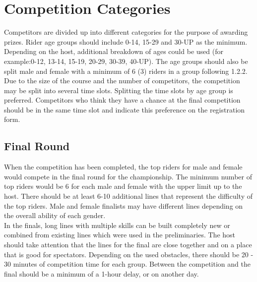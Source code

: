 \section{Competition Categories}
Competitors are divided up into different categories for the purpose of awarding prizes. Rider age groups should include 0-14, 15-29 and 30-UP as the minimum. Depending on the host, additional breakdown of ages could be used (for example:0-12, 13-14, 15-19, 20-29, 30-39, 40-UP). The age groups should also be split male and female with a minimum of 6 (3) riders in a group following 1.2.2. Due to the size of the course and the number of competitors, the competition may be split into several time slots. Splitting the time slots by age group is preferred. Competitors who think they have a chance at the final competition should be in the same time slot and indicate this preference on the registration form.
\subsection{Final Round}
When the competition has been completed, the top riders for male and female would compete in the final round for the championship. The minimum number of top riders would be 6 for each male and female with the upper limit up to the host. There should be at least 6-10 additional lines that represent the difficulty of the top riders. Male and female finalists may have different lines depending on the overall ability of each gender.\\
 In the finals, long lines with multiple skills can be built completely new or combined from existing lines which were used in the preliminaries. The host should take attention that the lines for the final are close together and on a place that is good for spectators. Depending on the used obstacles, there should be 20 - 30 minutes of competition time for each group. Between the competition and the final should be a minimum of a 1-hour delay, or on another day.
